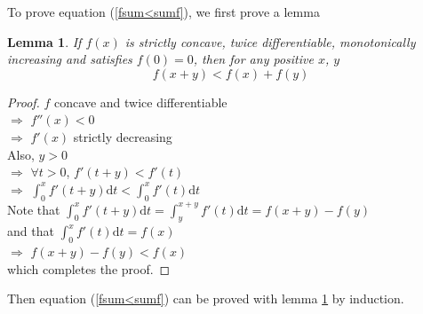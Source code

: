 \documentclass[12pt]{article}
\newtheorem{lemma}{Lemma}
\theoremstyle{definition}
\begin{document}
To prove equation (\ref{fsum<sumf}), we first prove a lemma
\begin{lemma}
	If $f(x)$ is strictly concave, twice differentiable, monotonically increasing and satisfies $f(0)=0$, then for any positive $x$, $y$
	$$f(x+y)<f(x)+f(y)$$ \label{lemma}
\end{lemma}
\begin{proof}
	$f$ concave and twice differentiable\\
	$\Rightarrow$ $f''(x)<0$\\	
	$\Rightarrow$ $f'(x)$ strictly decreasing\\	
	Also, $y>0$\\	
	$\Rightarrow$ $\forall t>0$, $f'(t+y)<f'(t)$\\	
	$\Rightarrow$ $\int_0^xf'(t+y)\mbox{d}t<\int_0^xf'(t)\mbox{d}t$\\
	Note that $\int_0^xf'(t+y)\mbox{d}t=\int_y^{x+y}f'(t)\mbox{d}t=f(x+y)-f(y)$\\
	and that $\int_0^xf'(t)\mbox{d}t=f(x)$\\
	$\Rightarrow$ $f(x+y)-f(y)<f(x)$\\
	which completes the proof.
\end{proof}

Then equation (\ref{fsum<sumf}) can be proved with lemma \ref{lemma} by induction.
\end{document}
